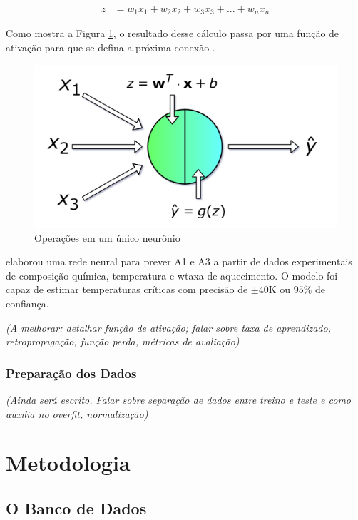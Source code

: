 \documentclass[brazil,tf,epusp]{usp}  %
\begin{document}
\begin{align}
  z &= {w}_1 {x}_1 + {w}_2 {x}_2 + {w}_3 {x}_3 + ... + {w}_n {x}_n \label{eq:single-neuron}
\end{align}

Como mostra a Figura \ref{fig:single-neuron}, o resultado desse cálculo passa por uma função de ativação para que se defina a próxima conexão \cite{Skalski2017}.

\begin{figure}[ht!]
  \includegraphics[width=.7\textwidth]{img/single-neuron.png}
  \caption{Operações em um único neurônio \cite{Skalski2017}}
  \label{fig:single-neuron}
\end{figure}

 elaborou uma rede neural para prever A1 e A3 a partir de dados experimentais de composição química, temperatura e wtaxa de aquecimento. O modelo foi capaz de estimar temperaturas críticas com precisão de $\pm 40$K ou $95\%$ de confiança.

\textit{(A melhorar: detalhar função de ativação; falar sobre taxa de aprendizado, retropropagação, função perda, métricas de avaliação)}

\subsection{Preparação dos Dados}
\textit{(Ainda será escrito. Falar sobre separação de dados entre treino e teste e como auxilia no overfit, normalização)}

\chapter{Metodologia}

\section{O Banco de Dados}

\label{sec:banco_dados}
\end{document}
